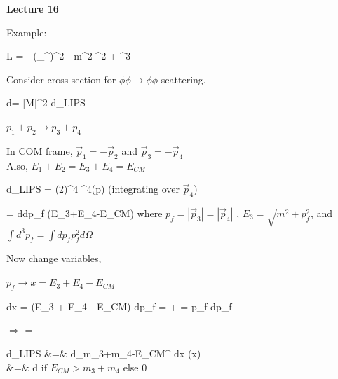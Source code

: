
\usepackage{braket}
\usepackage{bbm}
\usepackage{relsize}
\usepackage{tcolorbox}



\usepackage{cancel}

\usepackage{fancyhdr}

\fancyhf{}


\thispagestyle{fancy}

\begin{center}
{\huge \textbf{Lecture 16}}
\end{center}

{\fontsize{14}{16}\selectfont


Example: 

\be
L = - (\partial_\mu \phi \partial^\mu \phi)^2 - m^2 \phi^2 + \phi^3
\ee

Consider cross-section for $\phi\phi\rightarrow\phi\phi$ scattering.

\be
d\sigma =  |M|^2 d\Pi_{LIPS}
\ee

$p_1 + p_2 \rightarrow p_3 + p_4$


In COM frame,  $\vec{p}_1 = -\vec{p}_2$ and $\vec{p}_3 = -\vec{p}_4$\\
Also, $E_1 + E_2 = E_3+E_4 = E_{CM}$

\be
d\Pi_{LIPS} = (2\pi)^4 \delta^4(\sum p)    
\ee
(integrating over $\vec{p}_4$)

\be
=  d\Omega \int dp_f   \delta(E_3+E_4-E_{CM})
\ee
where $p_f = |\vec{p}_3| = |\vec{p}_4|$ , $E_3 = \sqrt{m^2 + p_f^2}$, and $\int d^3p_f = \int dp_f p_f^2 d\Omega$

Now change variables, 

$p_f \rightarrow x = E_3 + E_4 - E_{CM}$

\be
dx = (E_3 + E_4 - E_{CM}) dp_f =  +   =  p_f dp_f
\ee

$\Rightarrow$
\be
{} = 
\ee


\bea
d\Pi_{LIPS} &=&  d\Omega \int_{m_3+m_4-E_{CM}}^{\infty} dx  \delta(x) \\ 
&=&  d\Omega {} \textrm{if $E_{CM} > m_3 + m_4$ else 0 }
\eea

}
